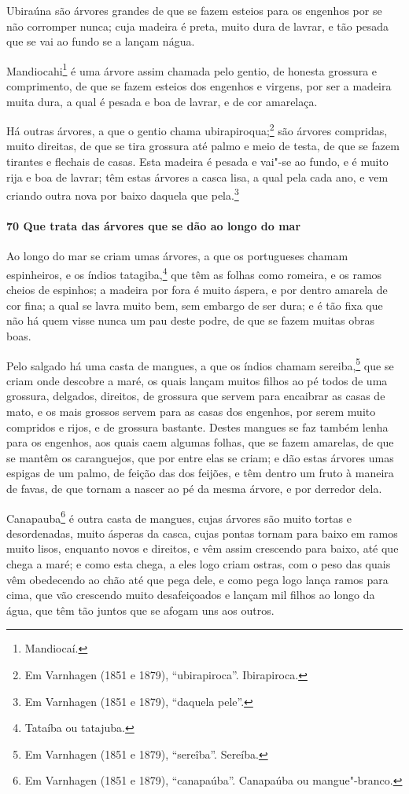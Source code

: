 Ubiraúna são árvores grandes de que se fazem esteios para os engenhos por se não corromper
nunca; cuja madeira é preta, muito dura de lavrar, e tão pesada que se vai ao fundo se a
lançam nágua.

Mandiocahi\footnote{ Mandiocaí.} é uma árvore assim chamada pelo gentio, de honesta
grossura e comprimento, de que se fazem esteios dos engenhos e virgens, por ser a madeira
muita dura, a qual é pesada e boa de lavrar, e de cor amarelaça.


Há outras árvores, a que o gentio chama ubirapiroqua;\footnote{ Em Varnhagen (1851 e
1879), ``ubirapiroca''. Ibirapiroca.} são árvores compridas, muito direitas, de que se
tira grossura até palmo e meio de testa, de que se fazem tirantes e flechais de casas.
Esta madeira é pesada e vai"-se ao fundo, e é muito rija e boa de lavrar; têm estas árvores
a casca lisa, a qual pela cada ano, e vem criando outra nova por baixo daquela que
pela.\footnote{ Em Varnhagen (1851 e 1879), ``daquela pele''.}

\paragraph{70 Que trata das árvores que se dão ao longo do mar}

Ao longo do mar se criam umas árvores, a que os portugueses chamam espinheiros, e os
índios tatagiba,\footnote{ Tataíba ou tatajuba.} que têm as folhas como romeira, e os
ramos cheios de espinhos; a madeira por fora é muito áspera, e por dentro amarela de cor
fina; a qual se lavra muito bem, sem embargo de ser dura; e é tão fixa que não há quem
visse nunca um pau deste podre, de que se fazem muitas obras boas.

Pelo salgado há uma casta de mangues, a que os índios chamam sereiba,\footnote{ Em
Varnhagen (1851 e 1879), ``sereîba''. Sereíba.} que se criam onde descobre a maré, os
quais lançam muitos filhos ao pé todos de uma grossura, delgados, direitos, de grossura
que servem para encaibrar as casas de mato, e os mais grossos servem para as casas dos
engenhos, por serem muito compridos e rijos, e de grossura bastante. Destes mangues se faz
também lenha para os engenhos, aos quais caem algumas folhas, que se fazem amarelas, de
que se mantêm os caranguejos, que por entre elas se criam; e dão estas árvores umas
espigas de um palmo, de feição das dos feijões, e têm dentro um fruto à maneira de favas,
de que tornam a nascer ao pé da mesma árvore, e por derredor dela.

Canapauba\footnote{ Em Varnhagen (1851 e 1879), ``canapaúba''. Canapaúba ou
mangue"-branco.} é outra casta de mangues, cujas árvores são muito tortas e desordenadas,
muito ásperas da casca, cujas pontas tornam para baixo em ramos muito lisos, enquanto
novos e direitos, e vêm assim crescendo para baixo, até que chega a maré; e como esta
chega, a eles logo criam ostras, com o peso das quais vêm obedecendo ao chão até que pega
dele, e como pega logo lança ramos para cima, que vão crescendo muito desafeiçoados e
lançam mil filhos ao longo da água, que têm tão juntos que se afogam uns aos outros.

